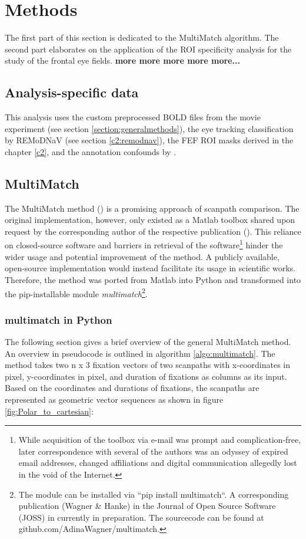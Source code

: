 \documentclass[a4paper, 12pt]{scrreprt}
\begin{document}
\section{Methods}
The first part of this section is dedicated to the MultiMatch algorithm. The second part elaborates on the application of the ROI specificity analysis for the study of the frontal eye fields.
\textbf{more more more more more...}
\subsection{Analysis-specific data}

This analysis uses the custom preprocessed BOLD files from the movie experiment (see section \ref{section:generalmethods}), the eye tracking classification by REMoDNaV (see section \ref{c2:remodnav}), the FEF ROI masks derived in the chapter \ref{c2}, and the annotation confounds by \textcite{hausler2016annotation}.

\subsection{MultiMatch}\label{section:multimatch}

The MultiMatch method (\cite{jarodzka2010vector}) is a promising approach of scanpath comparison. The original implementation, however, only existed as a Matlab toolbox shared upon request by the corresponding author of the respective publication (\cite{dewhurst2012depends}). This reliance on closed-source software and barriers in retrieval of the software\footnote{While acquisition of the toolbox via e-mail was prompt and complication-free, later correspondence with several of the authors was an odyssey of expired email addresses, changed affiliations and digital communication allegedly lost in the void of the Internet.} hinder the wider usage and potential improvement of the method. A publicly available, open-source implementation would instead facilitate its usage in scientific works. Therefore, the method was ported from Matlab into Python and transformed into the pip-installable module \textit{multimatch}\footnote{The module can be installed via ``pip install multimatch``. A corresponding publication (Wagner \& Hanke) in the Journal of Open Source Software (JOSS) in currently in preparation. The sourcecode can be found at github.com/AdinaWagner/multimatch.}.

\subsubsection{multimatch in Python}
The following section gives a brief overview of the general MultiMatch method. An overview in pseudocode is outlined in algorithm \ref{algo:multimatch}. \newline 
The method takes two n x 3 fixation vectors of two scanpaths with x-coordinates in pixel, y-coordinates in pixel, and duration of fixations as columns as its input. Based on the coordinates and durations of fixations, the scanpaths are represented as geometric vector sequences as shown in figure \ref{fig:Polar_to_cartesian}:
\end{document}
